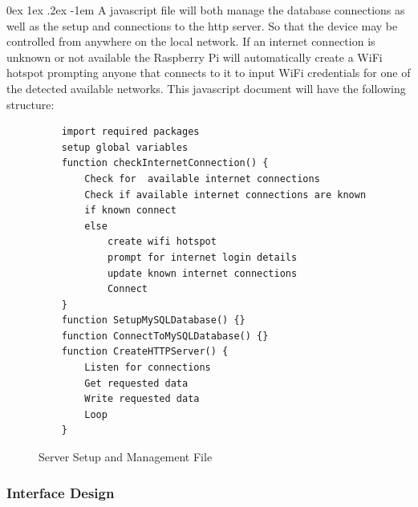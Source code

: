 \documentclass[12pt, a4paper]{article}
\makeatletter
\renewcommand\paragraph{\@startsection{paragraph}{5}{\parindent}%
  {0ex \@plus1ex \@minus.2ex}%
  {-1em}%
  {\normalfont\normalsize\bfseries}}
\makeatother
\begin{document}
                \paragraph{}
                    A javascript file will both manage the database connections as well as the setup and connections to the http server. So that the device may 
                    be controlled from anywhere on the local network. If an internet connection is unknown or not available the Raspberry Pi will automatically 
                    create a WiFi hotspot prompting anyone that connects to it to input WiFi credentials for one of the detected available networks. This javascript 
                    document will have the following structure:
                    \footnotesize
                    \begin{figure}[H]
                        \begin{lstlisting}
    import required packages
    setup global variables
    function checkInternetConnection() {
        Check for  available internet connections
        Check if available internet connections are known
        if known connect
        else
            create wifi hotspot
            prompt for internet login details
            update known internet connections
            Connect
    }
    function SetupMySQLDatabase() {}
    function ConnectToMySQLDatabase() {}
    function CreateHTTPServer() {
        Listen for connections
        Get requested data
        Write requested data
        Loop
    }
                        \end{lstlisting}
                        \caption{Server Setup and Management File}
                    \end{figure}
                \normalsize
            \subsubsection{Interface Design}
\end{document}
